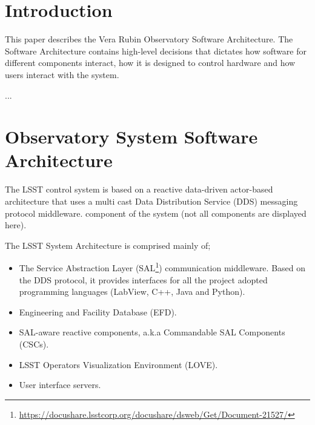 \section{Introduction}

This paper describes the Vera Rubin Observatory Software Architecture. The Software Architecture contains 
high-level decisions that dictates how software for different components interact, how it is designed to control hardware
and how users interact with the system.

...

\section{Observatory System Software Architecture}



The LSST control system is based on a reactive data-driven actor-based architecture that uses a multi cast Data Distribution Service 
(DDS) messaging protocol middleware. %
component of the system (not all components are displayed here).

The LSST System Architecture is comprised mainly of;
%
\begin{itemize}
\item The Service Abstraction Layer (SAL\footnote{\url{https://docushare.lsstcorp.org/docushare/dsweb/Get/Document-21527/}}) communication middleware. Based on the DDS protocol, it provides interfaces for all the project adopted programming languages (LabView, C++, Java and Python).
\item Engineering and Facility Database (EFD).
\item SAL-aware reactive components, a.k.a Commandable SAL Components (CSCs).
\item LSST Operators Visualization Environment (LOVE).
\item User interface servers.
\end{itemize}


